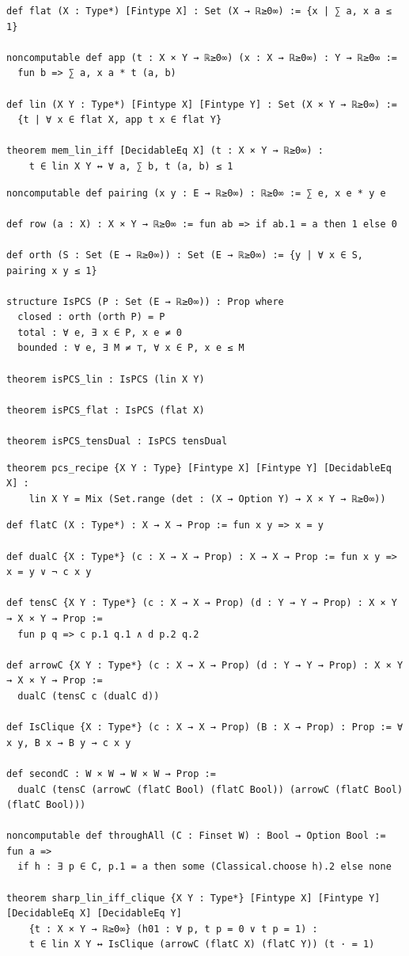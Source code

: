 \begin{lstlisting}
def flat (X : Type*) [Fintype X] : Set (X → ℝ≥0∞) := {x | ∑ a, x a ≤ 1}

noncomputable def app (t : X × Y → ℝ≥0∞) (x : X → ℝ≥0∞) : Y → ℝ≥0∞ :=
  fun b => ∑ a, x a * t (a, b)

def lin (X Y : Type*) [Fintype X] [Fintype Y] : Set (X × Y → ℝ≥0∞) :=
  {t | ∀ x ∈ flat X, app t x ∈ flat Y}

theorem mem_lin_iff [DecidableEq X] (t : X × Y → ℝ≥0∞) :
    t ∈ lin X Y ↔ ∀ a, ∑ b, t (a, b) ≤ 1
\end{lstlisting}

\begin{lstlisting}
noncomputable def pairing (x y : E → ℝ≥0∞) : ℝ≥0∞ := ∑ e, x e * y e

def row (a : X) : X × Y → ℝ≥0∞ := fun ab => if ab.1 = a then 1 else 0

def orth (S : Set (E → ℝ≥0∞)) : Set (E → ℝ≥0∞) := {y | ∀ x ∈ S, pairing x y ≤ 1}

structure IsPCS (P : Set (E → ℝ≥0∞)) : Prop where
  closed : orth (orth P) = P
  total : ∀ e, ∃ x ∈ P, x e ≠ 0
  bounded : ∀ e, ∃ M ≠ ⊤, ∀ x ∈ P, x e ≤ M

theorem isPCS_lin : IsPCS (lin X Y)

theorem isPCS_flat : IsPCS (flat X)

theorem isPCS_tensDual : IsPCS tensDual
\end{lstlisting}

\begin{lstlisting}
theorem pcs_recipe {X Y : Type} [Fintype X] [Fintype Y] [DecidableEq X] :
    lin X Y = Mix (Set.range (det : (X → Option Y) → X × Y → ℝ≥0∞))
\end{lstlisting}

\begin{lstlisting}
def flatC (X : Type*) : X → X → Prop := fun x y => x = y

def dualC {X : Type*} (c : X → X → Prop) : X → X → Prop := fun x y => x = y ∨ ¬ c x y

def tensC {X Y : Type*} (c : X → X → Prop) (d : Y → Y → Prop) : X × Y → X × Y → Prop :=
  fun p q => c p.1 q.1 ∧ d p.2 q.2

def arrowC {X Y : Type*} (c : X → X → Prop) (d : Y → Y → Prop) : X × Y → X × Y → Prop :=
  dualC (tensC c (dualC d))

def IsClique {X : Type*} (c : X → X → Prop) (B : X → Prop) : Prop := ∀ x y, B x → B y → c x y

def secondC : W × W → W × W → Prop :=
  dualC (tensC (arrowC (flatC Bool) (flatC Bool)) (arrowC (flatC Bool) (flatC Bool)))

noncomputable def throughAll (C : Finset W) : Bool → Option Bool := fun a =>
  if h : ∃ p ∈ C, p.1 = a then some (Classical.choose h).2 else none

theorem sharp_lin_iff_clique {X Y : Type*} [Fintype X] [Fintype Y] [DecidableEq X] [DecidableEq Y]
    {t : X × Y → ℝ≥0∞} (h01 : ∀ p, t p = 0 ∨ t p = 1) :
    t ∈ lin X Y ↔ IsClique (arrowC (flatC X) (flatC Y)) (t · = 1)
\end{lstlisting}

